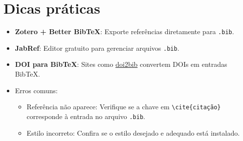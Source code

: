 \section{Dicas práticas}
\begin{itemize}
    \item \textbf{Zotero + Better BibTeX}: Exporte referências diretamente para \verb|.bib|.
    \item \textbf{JabRef}: Editor gratuito para gerenciar arquivos \verb|.bib|.
    \item \textbf{DOI para BibTeX}: Sites como \href{https://www.doi2bib.org/}{doi2bib} convertem DOIs em entradas BibTeX.
    \item Erros comuns:
    \begin{itemize}
        \item Referência não aparece: Verifique se a chave em \verb|\cite{citação}| corresponde à entrada no arquivo \verb|.bib|.
        \item Estilo incorreto: Confira se o estilo desejado e adequado está instalado.
    \end{itemize}
\end{itemize}
